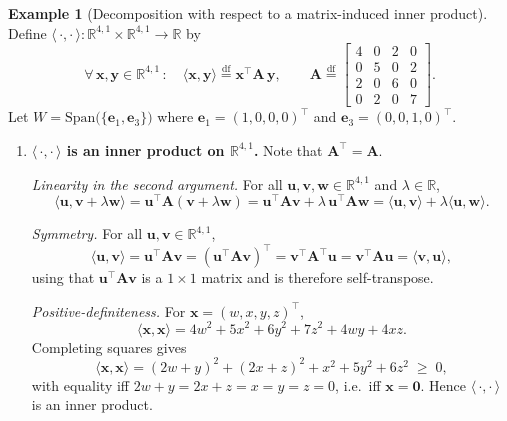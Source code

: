 \documentclass[11pt, a4paper, notitlepage]{report}
\theoremstyle{definition}
\newtheorem{example}[theorem]{Example}
\theoremstyle{remark}
\begin{document}
\begin{example}[Decomposition with respect to a matrix-induced inner product]
\label{ex:orth-comp-R41}
Define $\langle\,\cdot,\cdot\,\rangle : \mathbb{R}^{4,1}\times\mathbb{R}^{4,1}\to\mathbb{R}$ by
\[
  \forall\,\mathbf{x},\mathbf{y}\in\mathbb{R}^{4,1}\,:\quad
  \langle\mathbf{x},\mathbf{y}\rangle \stackrel{\mathrm{df}}{=}
  \mathbf{x}^\top \mathbf{A}\,\mathbf{y},
  \qquad
  \mathbf{A} \stackrel{\mathrm{df}}{=}
  \begin{bmatrix} 4 & 0 & 2 & 0\\ 0 & 5 & 0 & 2\\ 2 & 0 & 6 & 0\\ 0 & 2 & 0 & 7 \end{bmatrix}.
\]
Let $W = \mathrm{Span}\bigl(\{\mathbf{e}_1,\mathbf{e}_3\}\bigr)$ where
$\mathbf{e}_1 = (1,0,0,0)^\top$ and $\mathbf{e}_3 = (0,0,1,0)^\top$.

\begin{enumerate}
  \item \textbf{$\langle\,\cdot,\cdot\,\rangle$ is an inner product on
        $\mathbb{R}^{4,1}$.} Note that $\mathbf{A}^\top = \mathbf{A}$.

        \emph{Linearity in the second argument.} For all $\mathbf{u},\mathbf{v},\mathbf{w}\in\mathbb{R}^{4,1}$ and $\lambda\in\mathbb{R}$,
        \[
          \langle\mathbf{u},\mathbf{v}+\lambda\mathbf{w}\rangle
          = \mathbf{u}^\top\mathbf{A}(\mathbf{v}+\lambda\mathbf{w})
          = \mathbf{u}^\top\mathbf{A}\mathbf{v} + \lambda\,\mathbf{u}^\top\mathbf{A}\mathbf{w}
          = \langle\mathbf{u},\mathbf{v}\rangle + \lambda\langle\mathbf{u},\mathbf{w}\rangle.
        \]

        \emph{Symmetry.} For all $\mathbf{u},\mathbf{v}\in\mathbb{R}^{4,1}$,
        \[
          \langle\mathbf{u},\mathbf{v}\rangle
          = \mathbf{u}^\top\mathbf{A}\mathbf{v}
          = (\mathbf{u}^\top\mathbf{A}\mathbf{v})^\top
          = \mathbf{v}^\top\mathbf{A}^\top\mathbf{u}
          = \mathbf{v}^\top\mathbf{A}\mathbf{u}
          = \langle\mathbf{v},\mathbf{u}\rangle,
        \]
        using that $\mathbf{u}^\top\mathbf{A}\mathbf{v}$ is a $1\times 1$ matrix and is therefore self-transpose.

        \emph{Positive-definiteness.} For $\mathbf{x} = (w,x,y,z)^\top$,
        \[
          \langle\mathbf{x},\mathbf{x}\rangle
          = 4w^2 + 5x^2 + 6y^2 + 7z^2 + 4wy + 4xz.
        \]
        Completing squares gives
        \[
          \langle\mathbf{x},\mathbf{x}\rangle
          = (2w + y)^2 + (2x + z)^2 + x^2 + 5y^2 + 6z^2 \;\geq\; 0,
        \]
        with equality iff $2w+y = 2x+z = x = y = z = 0$, i.e.\ iff
        $\mathbf{x} = \mathbf{0}$. Hence $\langle\,\cdot,\cdot\,\rangle$ is an inner product.


\end{enumerate}
\end{example}
\end{document}
